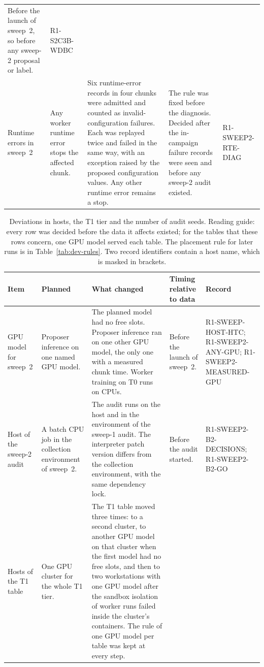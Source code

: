 \begin{table}[t]
\begin{tabular}{L{0.8in}L{1.3in}L{1.9in}L{1.25in}L{0.98in}}
Before the launch of sweep~2, so before any sweep-2 proposal or label. &
R1-S2C3B-WDBC \\
\addlinespace
Runtime errors in sweep~2 &
Any worker runtime error stops the affected chunk. &
Six runtime-error records in four chunks were admitted and counted as invalid-configuration failures. Each was replayed twice and failed in the same way, with an exception raised by the proposed configuration values. Any other runtime error remains a stop. &
The rule was fixed before the diagnosis. Decided after the in-campaign failure records were seen and before any sweep-2 audit existed. &
R1-SWEEP2-RTE-DIAG \\
\bottomrule
\end{tabular}
\end{table}

\begin{table}[t]
\caption{Deviations in hosts, the T1 tier and the number of audit seeds. Reading guide: every row was decided before the data it affects existed; for the tables that these rows concern, one GPU model served each table. The placement rule for later runs is in Table~\ref{tab:dev-rules}. Two record identifiers contain a host name, which is masked in brackets.}
\label{tab:dev-hosts}
\footnotesize
\setlength{\tabcolsep}{3pt}
\begin{tabular}{L{0.8in}L{1.3in}L{1.9in}L{1.25in}L{0.98in}}
\toprule
Item & Planned & What changed & Timing relative to data & Record \\
\midrule
GPU model for sweep~2 &
Proposer inference on one named GPU model. &
The planned model had no free slots. Proposer inference ran on one other GPU model, the only one with a measured chunk time. Worker training on T0 runs on CPUs. &
Before the launch of sweep~2. &
R1-SWEEP-HOST-HTC; R1-SWEEP2-ANY-GPU; R1-SWEEP2-MEASURED-GPU \\
\addlinespace
Host of the sweep-2 audit &
A batch CPU job in the collection environment of sweep~2. &
The audit runs on the host and in the environment of the sweep-1 audit. The interpreter patch version differs from the collection environment, with the same dependency lock. &
Before the audit started. &
R1-SWEEP2-B2-DECISIONS; R1-SWEEP2-B2-GO \\
\addlinespace
Hosts of the T1 table &
One GPU cluster for the whole T1 tier. &
The T1 table moved three times: to a second cluster, to another GPU model on that cluster when the first model had no free slots, and then to two workstations with one GPU model after the sandbox isolation of worker runs failed inside the cluster's containers. The rule of one GPU model per table was kept at every step. &

\end{tabular}
\end{table}
